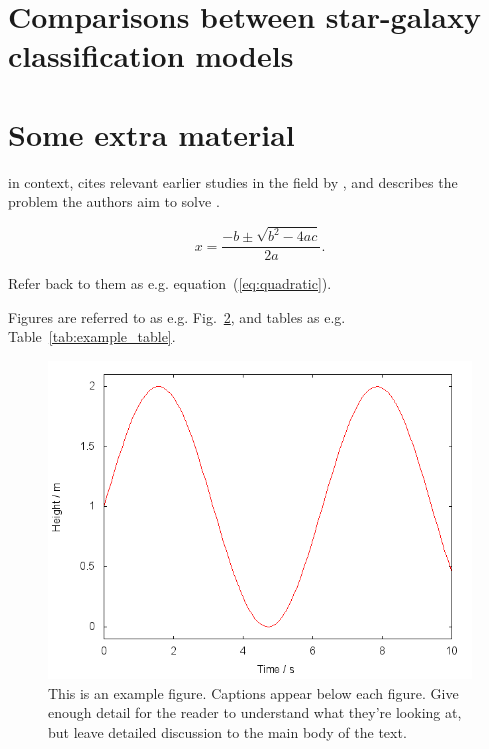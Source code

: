 \documentclass[fleqn,usenatbib]{mnras}
\begin{document}
\begin{figure}
    \label{fig:flow_galaxy}
\end{figure}


\section{Comparisons between star-galaxy classification models}\label{app:sgmodels}

\iffalse
\section{Some extra material}

in context, cites relevant earlier studies in the field by \citet{Others2013},
and describes the problem the authors aim to solve \citep[e.g.][]{Author2012}.

\begin{equation}
    x=\frac{-b\pm\sqrt{b^2-4ac}}{2a}.
	\label{eq:quadratic}
\end{equation}

Refer back to them as e.g. equation~(\ref{eq:quadratic}).

Figures are referred to as e.g. Fig.~\ref{fig:example_figure}, and tables as
e.g. Table~\ref{tab:example_table}.

\begin{figure}
	\includegraphics[width=\columnwidth]{example}
    \caption{This is an example figure. Captions appear below each figure.
	Give enough detail for the reader to understand what they're looking at,
	but leave detailed discussion to the main body of the text.}
    \label{fig:example_figure}
\end{figure}
\end{document}
